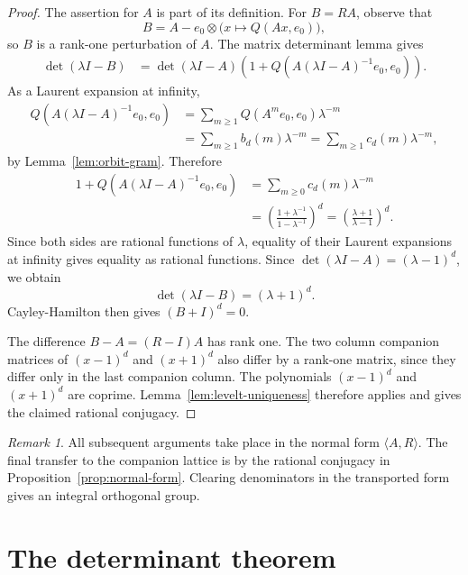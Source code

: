 \documentclass[a4paper,11pt]{amsart}
\theoremstyle{remark}
\newtheorem{remark}[theorem]{Remark}
\numberwithin{equation}{section}
\begin{document}
\begin{proof}
The assertion for \(A\) is part of its definition.  For \(B=RA\), observe that
\[
        B=A-e_0\otimes\bigl(x\mapsto Q(Ax,e_0)\bigr),
\]
so \(B\) is a rank-one perturbation of \(A\).  The matrix determinant lemma gives
\[
\begin{aligned}
        \det(\lambda I-B)
        &=
        \det(\lambda I-A)
        \left(
        1+Q(A(\lambda I-A)^{-1}e_0,e_0)
        \right).
\end{aligned}
\]
As a Laurent expansion at infinity,
\[
\begin{aligned}
        Q(A(\lambda I-A)^{-1}e_0,e_0)
        &=
        \sum_{m\ge1} Q(A^m e_0,e_0)\lambda^{-m}       \\
        &=
        \sum_{m\ge1} b_d(m)\lambda^{-m}
        =
        \sum_{m\ge1} c_d(m)\lambda^{-m},
\end{aligned}
\]
by Lemma~\ref{lem:orbit-gram}.  Therefore
\[
\begin{aligned}
        1+Q(A(\lambda I-A)^{-1}e_0,e_0)
        &=
        \sum_{m\ge0}c_d(m)\lambda^{-m}                  \\
        &=
        \left(\frac{1+\lambda^{-1}}{1-\lambda^{-1}}\right)^d
        =
        \left(\frac{\lambda+1}{\lambda-1}\right)^d.
\end{aligned}
\]
Since both sides are rational functions of \(\lambda\), equality of their Laurent expansions at infinity gives equality as rational functions.  Since \(\det(\lambda I-A)=(\lambda-1)^d\), we obtain
\[
        \det(\lambda I-B)=(\lambda+1)^d.
\]
Cayley-Hamilton then gives \((B+I)^d=0\).

The difference \(B-A=(R-I)A\) has rank one.  The two column companion matrices of \((x-1)^d\) and \((x+1)^d\) also differ by a rank-one matrix, since they differ only in the last companion column.  The polynomials \((x-1)^d\) and \((x+1)^d\) are coprime.  Lemma~\ref{lem:levelt-uniqueness} therefore applies and gives the claimed rational conjugacy.
\end{proof}

\begin{remark}
All subsequent arguments take place in the normal form \(\langle A,R\rangle\).  The final transfer to the companion lattice is by the rational conjugacy in Proposition~\ref{prop:normal-form}.  Clearing denominators in the transported form gives an integral orthogonal group.
\end{remark}

\section{The determinant theorem}
\end{document}
